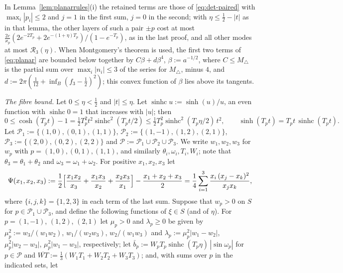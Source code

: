 In Lemma~\ref{lem:planarrules}(i) the retained terms are those of \eqref{eq:det-paired} with $\max_i|p_i|\le2$ and $j=1$ in the first
sum, $j=0$ in the second; with $\eta\le\frac12-|t|$ as in that lemma, the other layers of such a pair $\pm p$ cost at most
$\frac{2c}{\varkappa_p}(2e^{-2T_p}+2e^{-(1+\eta)T_p})/(1-e^{-T_p})$, as in the last proof, and all other modes at most
$\mathcal R_3(\eta)$. When
Montgomery's theorem is used, the first two terms of \eqref{eq:planar} are bounded below together by $C\beta+d\beta^4$,
$\beta:=a^{-1/2}$, where $C\le M_\triangle$ is the partial sum over $\max_i|n_i|\le3$ of the series for $M_\triangle$, minus $4$, and
$d:=2\pi(\frac1{12}+\inf_B(f_3-\frac12)^2)$; this convex function of $\beta$ lies above its tangents.

\emph{The fibre bound.} Let $0\le\eta<\frac12$ and $|t|\le\eta$. Let $\operatorname{sinhc}u:=\sinh(u)/u$, an even function with
$\operatorname{sinhc}0=1$ that increases with $|u|$; then
\begin{equation}\label{eq:det-sinhc}
  0\le\cosh(T_pt)-1=\tfrac12T_p^2t^2\operatorname{sinhc}^2(T_pt/2)\le\tfrac12T_p^2\operatorname{sinhc}^2(T_p\eta/2)\,t^2,\qquad
  \sinh(T_pt)=T_pt\,\operatorname{sinhc}(T_pt).
\end{equation}
Let $\mathcal P_1:=\{(1,0),(0,1),(1,1)\}$, $\mathcal P_2:=\{(1,-1),(1,2),(2,1)\}$, $\mathcal P_3:=\{(2,0),(0,2),(2,2)\}$ and
$\mathcal P:=\mathcal P_1\cup\mathcal P_2\cup\mathcal P_3$. We write $w_1,w_2,w_3$ for $w_p$ with $p=(1,0),(0,1),(1,1)$, and similarly
$\theta_i,\omega_i,T_i,W_i$; note that $\theta_3=\theta_1+\theta_2$ and $\omega_3=\omega_1+\omega_2$. For positive $x_1,x_2,x_3$ let
\[
  \Psi(x_1,x_2,x_3):=\frac12\Bigl[\frac{x_1x_2}{x_3}+\frac{x_1x_3}{x_2}+\frac{x_2x_3}{x_1}\Bigr]-\frac{x_1+x_2+x_3}2
   =\frac14\sum_{i=1}^3\frac{x_i\,(x_j-x_k)^2}{x_jx_k},
\]
where $\{i,j,k\}=\{1,2,3\}$ in each term of the last sum. Suppose that $w_p>0$ on $S$ for $p\in\mathcal P_1\cup\mathcal P_3$, and
define the following functions of $\xi\in S$ (and of $\eta$). For $p=(1,-1)$, $(1,2)$, $(2,1)$ let $\mu_p>0$ and $\lambda_p\ge0$ be
given by $\mu_p^2:=w_3/(w_1w_2)$, $w_1/(w_2w_3)$, $w_2/(w_1w_3)$ and $\lambda_p:=\mu_p^2|w_1-w_2|$, $\mu_p^2|w_2-w_3|$,
$\mu_p^2|w_1-w_3|$, respectively; let $\bar b_p:=W_pT_p\operatorname{sinhc}(T_p\eta)\,|\sin\omega_p|$ for $p\in\mathcal P$ and
$\overline{WT}:=\tfrac13(W_1T_1+W_2T_2+W_3T_3)$; and, with sums over $p$ in the indicated sets, let
